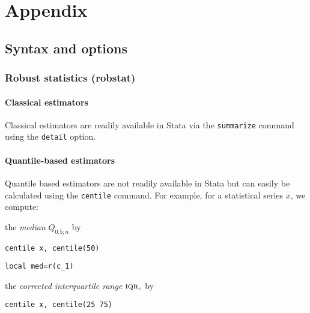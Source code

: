 \appendix
\part{Appendix}
\label{part:appendix}

\chapter{Syntax and options}

\section{Robust statistics (robstat)}
\label{sec:syntax:robstat}                                                      

\subsection{Classical estimators}

Classical estimators are readily available in Stata via the \texttt{summarize}
command using the \texttt{detail} option.

\subsection{Quantile-based estimators}

Quantile based estimators are not readily available in Stata but can easily be
calculated using the \texttt{centile} command. For example, for a statistical
series $x$, we compute:

\begin{description}
\item the \emph{median} $Q_{0.5;n}$ by
\end{description}

\texttt{centile x, centile(50)}

\texttt{local med=r(c\_1)}

\begin{description}
\item the \emph{corrected interquartile range} $\stsc{IQR}_c$ by
\end{description}

\texttt{centile x, centile(25 75)}

